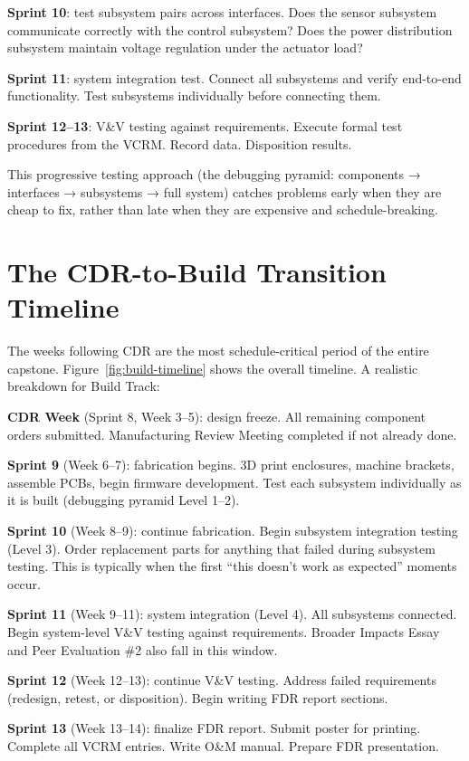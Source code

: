 \textbf{Sprint 10}: test subsystem pairs across interfaces. Does the sensor subsystem communicate correctly with the control subsystem? Does the power distribution subsystem maintain voltage regulation under the actuator load?

\textbf{Sprint 11}: system integration test. Connect all subsystems and verify end-to-end functionality. Test subsystems individually before connecting them.

\textbf{Sprint 12--13}: V\&V testing against requirements. Execute formal test procedures from the VCRM. Record data. Disposition results.

This progressive testing approach (the debugging pyramid: components → interfaces → subsystems → full system) catches problems early when they are cheap to fix, rather than late when they are expensive and schedule-breaking.



\section{The CDR-to-Build Transition Timeline}
The weeks following CDR are the most schedule-critical period of the entire capstone. Figure~\ref{fig:build-timeline} shows the overall timeline. A realistic breakdown for Build Track:

\textbf{CDR Week} (Sprint 8, Week 3--5): design freeze. All remaining component orders submitted. Manufacturing Review Meeting completed if not already done.

\textbf{Sprint 9} (Week 6--7): fabrication begins. 3D print enclosures, machine brackets, assemble PCBs, begin firmware development. Test each subsystem individually as it is built (debugging pyramid Level 1--2).

\textbf{Sprint 10} (Week 8--9): continue fabrication. Begin subsystem integration testing (Level 3). Order replacement parts for anything that failed during subsystem testing. This is typically when the first ``this doesn't work as expected'' moments occur.

\textbf{Sprint 11} (Week 9--11): system integration (Level 4). All subsystems connected. Begin system-level V\&V testing against requirements. Broader Impacts Essay and Peer Evaluation \#2 also fall in this window.

\textbf{Sprint 12} (Week 12--13): continue V\&V testing. Address failed requirements (redesign, retest, or disposition). Begin writing FDR report sections.

\textbf{Sprint 13} (Week 13--14): finalize FDR report. Submit poster for printing. Complete all VCRM entries. Write O\&M manual. Prepare FDR presentation.

